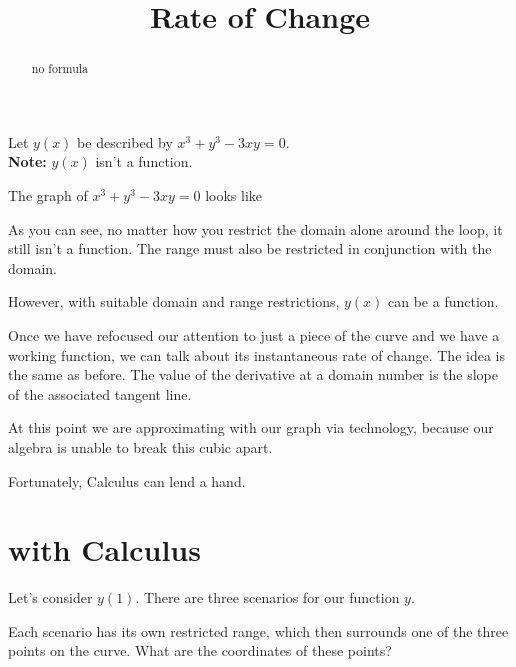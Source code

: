\documentclass{ximera}
\title{Rate of Change}
\begin{document}
\begin{abstract}
no formula
\end{abstract}
\maketitle




Let $y(x)$ be described by $x^3 + y^3 - 3 x y = 0$. \\
\textbf{Note: } $y(x)$ isn't a function.



The graph of $x^3 + y^3 - 3 x y = 0$ looks like




\begin{center}
\end{center}


As you can see, no matter how you restrict the domain alone around the loop, it still isn't a function. The range must also be restricted in conjunction with the domain.

However, with suitable domain and range restrictions, $y(x)$ can be a function. 


Once we have refocused our attention to just a piece of the curve and we have a working function, we can talk about its instantaneous rate of change.  The idea is the same as before.  The value of the derivative at a domain number is the slope of the associated tangent line.


At this point we are approximating with our graph via technology, because our algebra is unable to break this cubic apart.



Fortunately, Calculus can lend a hand.




\section*{with Calculus}

Let's consider $y(1)$.  There are three scenarios for our function $y$.


\begin{center}
\end{center}

Each scenario has its own restricted range, which then surrounds one of the three points on the curve. What are the coordinates of these points?
\end{document}
